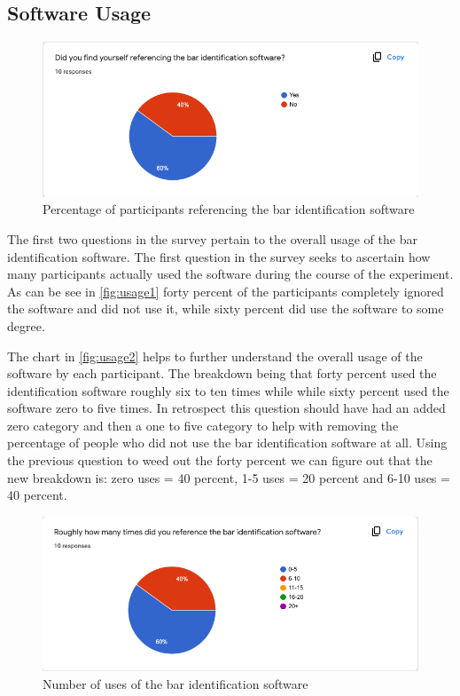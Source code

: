 \documentclass{vgtc}                          %
\begin{document}
\subsection{Software Usage}

\begin{figure}[!htbp]
    \centering
    \includegraphics[width=\columnwidth]{pictures/usage1.png}
    \caption{Percentage of participants referencing the bar identification software}
    \label{fig:usage1}
\end{figure}


The first two questions in the survey pertain to the overall usage of the bar identification software. The first question in the survey seeks to ascertain how many participants actually used the software during the course of the experiment. As can be see in \autoref{fig:usage1} forty percent of the participants completely ignored the software and did not use it, while sixty percent did use the software to some degree. 

The chart in \autoref{fig:usage2} helps to further understand the overall usage of the software by each participant. The breakdown being that forty percent used the identification software roughly six to ten times while while sixty percent used the software zero to five times. In retrospect this question should have had an added zero category and then a one to five category to help with removing the percentage of people who did not use the bar identification software at all. Using the previous question to weed out the forty percent we can figure out that the new breakdown is: zero uses = 40 percent, 1-5 uses = 20 percent and 6-10 uses = 40 percent.



\begin{figure}[!htbp]
    \centering
    \includegraphics[width=\columnwidth]{pictures/usage2.png}
    \caption{Number of uses of the bar identification software}
    \label{fig:usage2}
\end{figure}
\end{document}
